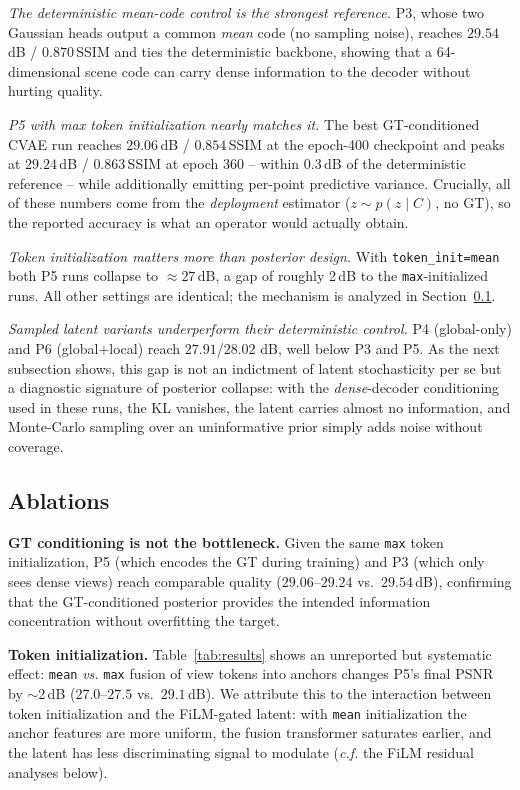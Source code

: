 \emph{The deterministic mean-code control is the strongest reference.}
P3, whose two Gaussian heads output a common \emph{mean} code (no
sampling noise), reaches $29.54$\,dB / $0.870$\,SSIM and ties the
deterministic backbone, showing that a 64-dimensional scene code can
carry dense information to the decoder without hurting quality.

\emph{P5 with max token initialization nearly matches it.} The best
GT-conditioned CVAE run reaches $29.06$\,dB / $0.854$\,SSIM at the
epoch-400 checkpoint and peaks at $29.24$\,dB / $0.863$\,SSIM at
epoch 360 -- within $0.3$\,dB of the deterministic reference -- while
additionally emitting per-point predictive variance. Crucially, all of
these numbers come from the \emph{deployment} estimator
($z\sim p(z\mid C)$, no GT), so the reported accuracy is what an
operator would actually obtain.

\emph{Token initialization matters more than posterior design.} With
\texttt{token\_init=mean} both P5 runs collapse to $\approx 27$\,dB,
a gap of roughly 2\,dB to the \texttt{max}-initialized runs. All other
settings are identical; the mechanism is analyzed in
Section~\ref{sec:exp:ablation}.

\emph{Sampled latent variants underperform their deterministic
control.} P4 (global-only) and P6 (global+local) reach $27.91$/$28.02$
dB, well below P3 and P5. As the next subsection shows, this gap is not
an indictment of latent stochasticity per se but a diagnostic signature
of posterior collapse: with the \emph{dense}-decoder conditioning used
in these runs, the KL vanishes, the latent carries almost no
information, and Monte-Carlo sampling over an uninformative prior simply
adds noise without coverage.

\subsection{Ablations}
\label{sec:exp:ablation}

\textbf{GT conditioning is not the bottleneck.}
Given the same \texttt{max} token initialization, P5 (which encodes the
GT during training) and P3 (which only sees dense views) reach
comparable quality ($29.06$--$29.24$ vs.\ $29.54$\,dB), confirming that
the GT-conditioned posterior provides the intended information
concentration without overfitting the target.

\textbf{Token initialization.}
Table~\ref{tab:results} shows an unreported but systematic effect:
\texttt{mean} \emph{vs.} \texttt{max} fusion of view tokens into
anchors changes P5's final PSNR by $\sim\!2$\,dB ($27.0$--$27.5$ vs.\
$29.1$\,dB). We attribute this to the interaction between token
initialization and the FiLM-gated latent: with \texttt{mean}
initialization the anchor features are more uniform, the fusion
transformer saturates earlier, and the latent has less discriminating
signal to modulate (\emph{c.f.} the FiLM residual analyses below).

